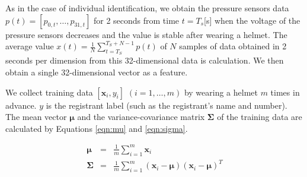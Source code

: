 \documentclass[sigchi,authordraft]{acmart}
\begin{document}

As in the case of individual identification, we obtain the pressure sensors data $p(t)=[p_{0,t},\dots,p_{31,t}]$ for 2 seconds from time $t=T_s$[s] when the voltage of the pressure sensors decreases and the value is stable after wearing a helmet. The average value $x(t)=\frac{1}{N}\sum_{t=T_S}^{T_S+N-1}p(t)$ of $N$ samples of data obtained in 2 seconds per dimension from this 32-dimensional data is calculation. We then obtain a single 32-dimensional vector as a feature.


We collect training data $[\bm{x}_i,y_i]$ $(i=1,\dots, m)$ by wearing a helmet $m$ times in advance. $y$ is the registrant label (such as the registrant's name and number). The mean vector $\bm{\mu}$ and the variance-covariance matrix $\bm{\Sigma}$ of the training data are calculated by Equations \ref{eqn:mu} and \ref{eqn:sigma}.

\begin{eqnarray}
\label{eqn:mu}
  \bm{\mu} &=& \frac{1}{m}\sum_{i=1}^{m}\bm{x}_i \\
\label{eqn:sigma}
  \bm{\Sigma} &=& \frac{1}{m}\sum_{i=1}^{m}(\bm{x}_i-\bm{\mu})(\bm{x}_i-\bm{\mu})^T
\end{eqnarray}


\end{document}
